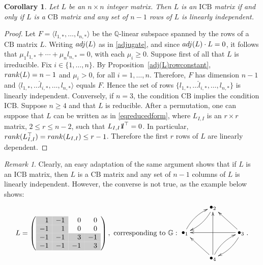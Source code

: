 \documentclass[10pt]{amsart}
\newcommand{\y}{\cellcolor{gray!40}}
\newcommand{\mbq}{\mbox{$\mathbb{Q}$}}
\newcommand{\mbg}{\mbox{$\mathbb{G}$}}
\newcommand{\mbone}{\mbox{$1\mkern-4.6mu {\rm l}$}}
\newcommand{\icb}{\mbox{$\mathrm{ICB}$}}
\newcommand{\cb}{\mbox{$\mathrm{CB}$}}
\newcommand{\rank}{\mbox{${\rm rank}$}}
\newcommand{\adj}{\mbox{${\rm adj}$}}
\newtheorem{corollary}[cdrthm]{Corollary}
\theoremstyle{definition}
\theoremstyle{remark}
\newtheorem{remark}[cdrthm]{Remark}
\begin{document}
\begin{corollary} \label{ICBvsCB}
Let $L$ be an $n\times n$ integer matrix. Then $L$ is an $\icb$ matrix
if and only if $L$ is a $\cb$ matrix and any set of $n-1$ rows of $L$
is linearly independent.
\end{corollary}
\begin{proof}
Let $F=\langle l_{1,*},\ldots,l_{n,*}\rangle$ be the $\mbq$-linear
subspace spanned by the rows of a $\cb$ matrix $L$. Writing $\adj(L)$
as in \eqref{adjugate}, and since $\adj(L)\cdot L=0$, it follows that
$\mu_1l_{1,*}+\cdots +\mu_nl_{n,*}=0$, with each $\mu_i\geq 0$.
Suppose first of all that $L$ is irreducible. Fix $i\in\{1,\ldots
,n\}$. By Proposition~\ref{adj(L)rowconstant}, $\rank(L)=n-1$ and
$\mu_i>0$, for all $i=1,\ldots ,n$. Therefore, $F$ has dimension $n-1$
and $\langle l_{1,*},\ldots \widehat{l}_{i,*},\ldots,l_{n,*}\rangle$
equals $F$. Hence the set of rows $\{l_{1,*},\ldots
\widehat{l}_{i,*},\ldots,l_{n,*}\}$ is linearly
independent. Conversely, if $n=3$, the condition $\cb$ implies the
condition $\icb$. Suppose $n\geq 4$ and that $L$ is reducible. After a
permutation, one can suppose that $L$ can be written as in
\eqref{eqreducedform}, where $L_{I,I}$ is an $r\times r$ matrix,
$2\leq r\leq n-2$, such that $L_{I,I}\mbone^{\top}=0$. In particular,
$\rank(L_{I,I}^{\top})=\rank(L_{I,I})\leq r-1$. Therefore the first
$r$ rows of $L$ are linearly dependent.
\end{proof}

\begin{remark}\label{NotICB}
Clearly, an easy adaptation of the same argument shows that if $L$ is
an $\icb$ matrix, then $L$ is a $\cb$ matrix and any set of $n-1$
columns of $L$ is linearly independent. However, the converse is not
true, as the example below shows:
\begin{eqnarray*}
L=\left(\begin{array}{rrrr}
\y1&\y-1&0&0\\
\y-1&\y1&0&0\\
\y-1&\y-1&\y3&\y-1\\
\y-1&\y-1&\y-1&\y3
\end{array}\right),\mbox{ corresponding to }\mbg:
\vcenter{\xymatrix{ & \bullet_2 \ar@/^/[dl] & \\ \bullet_1 \ar@/^/[ur]
    & & \bullet_3 \ar[ll] \ar@/^/[dl] \ar[ul]\\ & \bullet_4 \ar[uu]
    \ar[ul] \ar@/^/[ur]}}.
\end{eqnarray*}
\end{remark}
\end{document}
